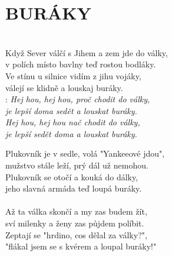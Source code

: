 \section*{\Huge BURÁKY}\\

Když Sever válčí s Jihem a zem jde do války,\\
v polích místo bavlny teď rostou bodláky.\\
Ve stínu u silnice vidím z jihu vojáky,\\
válejí se klidně a louskaj buráky.\\

\textregistered: \emph{
Hej hou, hej hou, proč chodit do války,\\
je lepší doma sedět a louskat buráky.\\
Hej hou, hej hou nač chodit do války,\\
je lepší sedět doma a louskat buráky.\\
}

Plukovník je v sedle, volá "Yankeeové jdou",\\
mužstvo stále leží, prý dál už nemohou.\\
Plukovník se otočí a kouká do dálky,\\
jeho slavná armáda teď loupá buráky.\\
\textregistered\\

Až ta válka skončí a my zas budem žít,\\
sví milenky a ženy zas půjdem políbit.\\
Zeptají se "hrdino, cos dělal za války?",\\
"flákal jsem se s kvérem a loupal buráky!"

\textregistered \textregistered

\newpage
